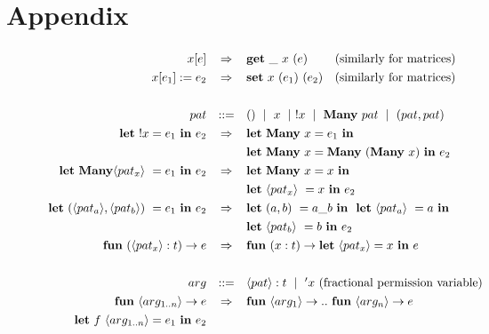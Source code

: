 \section{Appendix}

\begin{figure}[t]
\begin{center}
\[\def\arraystretch{1.3}
    \begin{array}{rcl}
    x[e] &
    \Rightarrow &
    \mathbf{get}\ \_\ x\ (e) \;\qquad \textrm{(similarly for matrices)}
\\
    x[e_1] := e_2 &
    \Rightarrow &
    \mathbf{set}\ x\ (e_1)\ (e_2) \quad \textrm{(similarly for matrices)}
\\
\\
    pat & ::= & ()\ \mid\ x\ \mid\ !x\ \mid\ \mathbf{Many\ } pat\ \mid\ (pat, pat)
\\
    \mathbf{let}\ !x = e_1\ \mathbf{in}\ e_2 &
    \Rightarrow &
    \specialcell[t]{l}{\mathbf{let\ Many}\ x = e_1\ \mathbf{in\ } \\
    \mathbf{let\ Many}\ x = \mathbf{Many}\ (\mathbf{Many}\ x)\ \mathbf{in}\ e_2}
\\
    \mathbf{let\ Many} \langle pat_x \rangle\ = e_1\ \mathbf{in}\ e_2 &
    \Rightarrow &
    \specialcell[t]{l}{%
        \mathbf{let\ Many}\ x = x\ \mathbf{in\ } \\
        \mathbf{let\ } \langle pat_x \rangle\ = x\ \mathbf{in\ } e_2}
\\
    \mathbf{let}\ (\langle pat_a \rangle, \langle pat_b \rangle)\  = e_1\ \mathbf{in}\ e_2 &
    \Rightarrow &
    \specialcell[t]{l}{%
        \mathbf{let\ } (a,b)\ = a\_b\ \mathbf{in\ }
        \ \mathbf{let\ } \langle pat_a \rangle\ = a\ \mathbf{in\ } \\
        \mathbf{let\ } \langle pat_b \rangle\ = b\ \mathbf{in\ } e_2}
\\
    \mathbf{fun}\ (\langle pat_x \rangle : t) \rightarrow e &
    \Rightarrow &
    \mathbf{fun}\ (x : t) \rightarrow \mathbf{let\ } \langle pat_x \rangle = x\ \mathbf{in\ } e
\\
\\
    arg & ::= & \langle pat \rangle : t\ \mid\ {'x} \textrm{ (fractional permission variable)}
\\
    \mathbf{fun}\ \langle arg_{1 .. n} \rangle \rightarrow e &
    \Rightarrow &
    \mathbf{fun}\ \langle arg_1 \rangle \rightarrow ..
    \ \mathbf{fun}\ \langle arg_n \rangle \rightarrow e
\\
    \mathbf{let}\ f\ {\langle arg_{1 .. n} \rangle} = e_1\ \mathbf{in}\ e_2 &

\end{array}\]
\end{center}
\end{figure}
